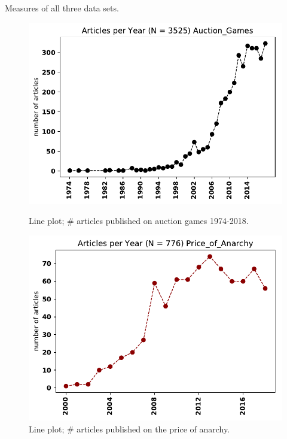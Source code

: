 \documentclass{article}
\theoremstyle{definition}
\begin{document}
\begin{table}[!hbtp]
        \centering
        \resizebox{\textwidth}{!}{
        }
        \caption{Measures of all three data sets.}\label{table:summary_other_topics}
\end{table}

\begin{figure}[!hbtp]
    \begin{minipage}{.45\textwidth}
        \centering
        \includegraphics[width=\textwidth]{./assets/images/Auction_Games.pdf}
        \caption{Line plot; \# articles published on auction games 1974-2018.}\label{fig:timeseries_ag}
    \end{minipage}%
    \begin{minipage}{.45\textwidth}
        \centering
        \includegraphics[width=\textwidth]{./assets/images/Price_of_Anarchy.pdf}
        \caption{Line plot; \# articles published on the price of anarchy.}\label{fig:timeseries_pa}
    \end{minipage}
    \end{figure}
\end{document}
